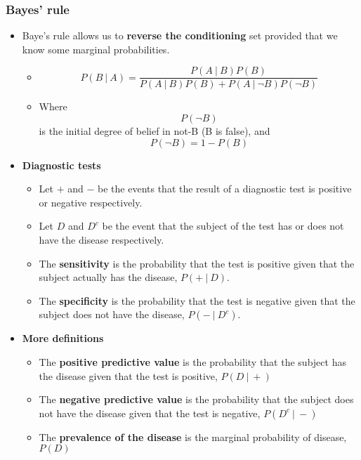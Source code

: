 \documentclass[10pt,article]{article}
\begin{document}
\subsubsection{Bayes' rule}
\label{sec:orgd15260f}
\begin{itemize}
\item Baye's rule allows us to \textbf{reverse the conditioning} set provided that we {\color{green}know some marginal probabilities}.
\begin{itemize}
\item $$ P(B ~|~ A) = \frac{P(A ~|~ B) P(B)}{P(A ~|~ B) P(B) + P(A ~|~ \neg B)P(\neg B)}$$

\item Where $$P(\neg B)$$ is the {\color{green}initial degree of belief in not-B (B is false)}, and $$P(\neg B)=1-P(B)$$
\end{itemize}
\end{itemize}
\begin{itemize}
\item \textbf{Diagnostic tests}
\label{sec:org8cee536}
\begin{itemize}
\item Let \(+\) and \(-\) be the events that the result of a diagnostic test is positive or negative respectively.
\item Let \(D\) and \(D^c\) be the event that the subject of the test has or does not have the disease respectively.
\item The \textbf{\textbf{sensitivity}} is the probability that the test is positive given that the subject actually has the disease, \(P(+ ~|~ D)\).
\item The \textbf{\textbf{specificity}} is the probability that the test is negative given that the subject does not have the disease, \(P(- ~|~ D^c)\).
\end{itemize}
\item \textbf{More definitions}
\label{sec:org6beb372}
\begin{itemize}
\item The \textbf{\textbf{positive predictive value}} is the probability that the subject has the  disease given that the test is positive, \(P(D ~|~ +)\)
\item The \textbf{\textbf{negative predictive value}} is the probability that the subject does not have the disease given that the test is negative, \(P(D^c ~|~ -)\)
\item The \textbf{\textbf{prevalence of the disease}} is the marginal probability of disease, \(P(D)\)
\end{itemize}
\end{itemize}
\end{document}
